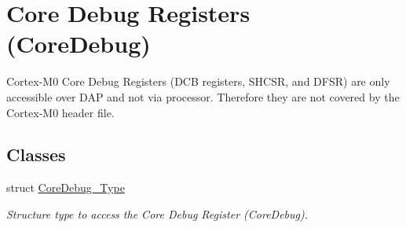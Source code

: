 \hypertarget{group___c_m_s_i_s___core_debug}{\section{Core Debug Registers (Core\-Debug)}
\label{group___c_m_s_i_s___core_debug}
}


Cortex-\/\-M0 Core Debug Registers (D\-C\-B registers, S\-H\-C\-S\-R, and D\-F\-S\-R) are only accessible over D\-A\-P and not via processor. Therefore they are not covered by the Cortex-\/\-M0 header file.  


\subsection*{Classes}
\begin{DoxyCompactItemize}
\item 
struct \hyperlink{struct_core_debug___type}{Core\-Debug\-\_\-\-Type}
\begin{DoxyCompactList}\small\item\em Structure type to access the Core Debug Register (Core\-Debug). \end{DoxyCompactList}\end{DoxyCompactItemize}
